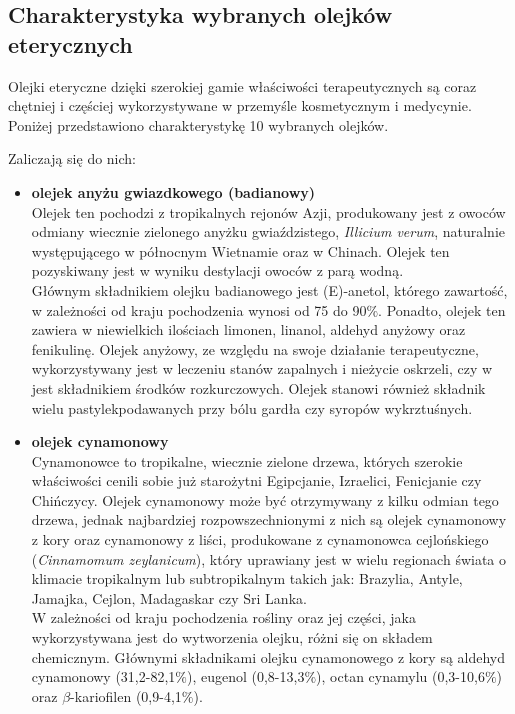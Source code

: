 \documentclass[11pt,a4paper]{report}
\begin{document}
\subsection{Charakterystyka wybranych olejków eterycznych}
Olejki eteryczne dzięki szerokiej gamie właściwości terapeutycznych są coraz chętniej i częściej wykorzystywane w przemyśle kosmetycznym i medycynie. Poniżej przedstawiono charakterystykę 10 wybranych olejków.

Zaliczają się do nich:
\begin{itemize}
\item \textbf{olejek anyżu gwiazdkowego (badianowy)}\\
Olejek ten pochodzi z tropikalnych rejonów Azji, produkowany jest z owoców odmiany wiecznie zielonego anyżku gwiaździstego, \textit{Illicium verum}, naturalnie występującego w północnym Wietnamie oraz w Chinach. Olejek ten pozyskiwany jest w wyniku destylacji owoców z parą wodną\cite{pollena_a, lis}.\\
Głównym składnikiem olejku badianowego jest (E)-anetol, którego zawartość, w zależności od kraju pochodzenia wynosi od 75 do 90$\%$. 
Ponadto, olejek ten zawiera w niewielkich ilościach limonen, linanol, aldehyd anyżowy oraz fenikulinę\cite{lis, Lawrence}. Olejek anyżowy, ze względu na swoje działanie terapeutyczne, wykorzystywany jest w leczeniu stanów zapalnych i nieżycie oskrzeli, czy w jest składnikiem środków rozkurczowych. Olejek stanowi również składnik wielu pastylekpodawanych przy bólu gardła czy syropów wykrztuśnych\cite{lis, deido}.

\item \textbf{olejek cynamonowy}\\
Cynamonowce to tropikalne, wiecznie zielone drzewa, których szerokie właściwości cenili sobie już starożytni Egipcjanie, Izraelici, Fenicjanie czy Chińczycy. Olejek cynamonowy może być otrzymywany z kilku odmian tego drzewa, jednak najbardziej rozpowszechnionymi z nich są olejek cynamonowy z kory oraz cynamonowy z liści, produkowane z cynamonowca cejlońskiego (\textit{Cinnamomum zeylanicum}), który uprawiany jest w wielu regionach świata o klimacie tropikalnym lub subtropikalnym takich jak: Brazylia, Antyle, Jamajka, Cejlon, Madagaskar czy Sri Lanka\cite{pollena_c, gorailis}.\\
W zależności od kraju pochodzenia rośliny oraz jej części, jaka wykorzystywana jest do wytworzenia olejku, różni się on składem chemicznym. Głównymi składnikami olejku cynamonowego z kory są aldehyd cynamonowy (31,2-82,1$\%$), eugenol (0,8-13,3$\%$), octan cynamylu (0,3-10,6$\%$) oraz  $\beta$-kariofilen (0,9-4,1$\%$)\cite{gorailis, kedzia2012}.


\end{itemize}
\end{document}
